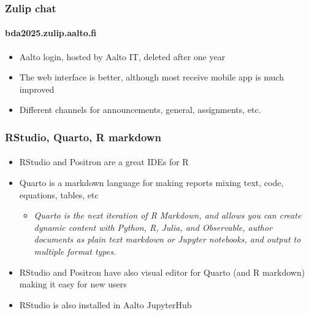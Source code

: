 \documentclass[english,t]{beamer}
\begin{document}
\begin{frame}

  \frametitle{Zulip chat}  %
  \framesubtitle{bda2025.zulip.aalto.fi}

  \begin{itemize}
  \item Aalto login, hosted by Aalto IT, deleted after one year
  \item The web interface is better, although most receive mobile app
    is much improved
  \item Different channels for announcements, general, assignments, etc.
  \end{itemize}
  
\end{frame}

\begin{frame}

  \frametitle{RStudio, Quarto, R markdown}  %
  \framesubtitle{}

  \begin{itemize}
  \item RStudio and Positron are a great IDEs for R
  \item Quarto is a markdown language for making reports mixing
    text, code, equations, tables, etc
    \begin{itemize}
    \item \textit{Quarto is the next iteration of R Markdown, and
        allows you can create dynamic content with Python, R, Julia,
        and Observable, author documents as plain text markdown or
        Jupyter notebooks, and output to multiple format types.}
    \end{itemize}
  \item RStudio and Positron have also visual editor for Quarto (and R markdown)
    making it easy for new users
  \item RStudio is also installed in Aalto JupyterHub
  \end{itemize}
  
\end{frame}  
\end{document}
